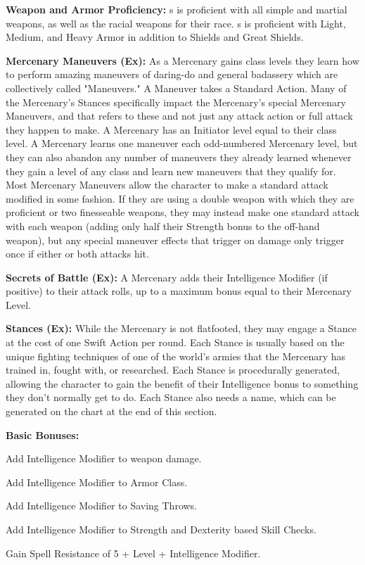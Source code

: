 \classfeatures

\textbf{Weapon and Armor Proficiency:} \currentclassname{}s is proficient with all simple and martial weapons, as well as the racial weapons for their race. \currentclassname{}s is proficient with Light, Medium, and Heavy Armor in addition to Shields and Great Shields.

\textbf{Mercenary Maneuvers (Ex):} As a Mercenary gains class levels they learn how to perform amazing maneuvers of daring-do and general badassery which are collectively called "Maneuvers." A Maneuver takes a Standard Action. Many of the Mercenary's Stances specifically impact the Mercenary's special Mercenary Maneuvers, and that refers to these and not just any attack action or full attack they happen to make. A Mercenary has an Initiator level equal to their class level. A Mercenary learns one maneuver each odd-numbered Mercenary level, but they can also abandon any number of maneuvers they already learned whenever they gain a level of any class and learn new maneuvers that they qualify for. Most Mercenary Maneuvers allow the character to make a standard attack modified in some fashion. If they are using a double weapon with which they are proficient or two finesseable weapons, they may instead make one standard attack with each weapon (adding only half their Strength bonus to the off-hand weapon), but any special maneuver effects that trigger on damage only trigger once if either or both attacks hit.

\textbf{Secrets of Battle (Ex):} A Mercenary adds their Intelligence Modifier (if positive) to their attack rolls, up to a maximum bonus equal to their Mercenary Level.

\textbf{Stances (Ex):} While the Mercenary is not flatfooted, they may engage a Stance at the cost of one Swift Action per round. Each Stance is usually based on the unique fighting techniques of one of the world's armies that the Mercenary has trained in, fought with, or researched. Each Stance is procedurally generated, allowing the character to gain the benefit of their Intelligence bonus to something they don't normally get to do. Each Stance also needs a name, which can be generated on the chart at the end of this section.

\textbf{Basic Bonuses:}
\begin{itemize*}
\item Add Intelligence Modifier to weapon damage.
\item Add Intelligence Modifier to Armor Class.
\item Add Intelligence Modifier to Saving Throws.
\item Add Intelligence Modifier to Strength and Dexterity based Skill Checks.
\item Gain Spell Resistance of 5 + Level + Intelligence Modifier.
\end{itemize*}

